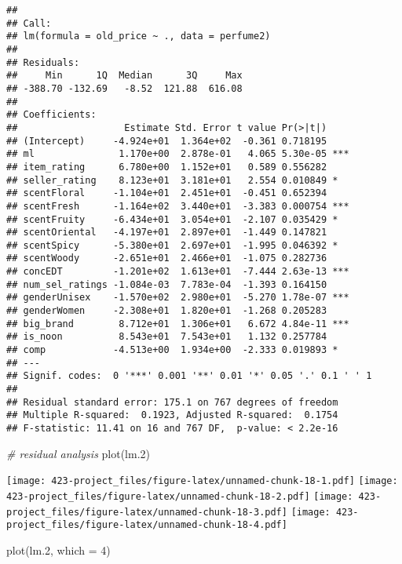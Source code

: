 \documentclass[
]{article}
\newenvironment{Shaded}{\begin{snugshade}}{\end{snugshade}}
\newcommand{\AttributeTok}[1]{\textcolor[rgb]{0.77,0.63,0.00}{#1}}
\newcommand{\CommentTok}[1]{\textcolor[rgb]{0.56,0.35,0.01}{\textit{#1}}}
\newcommand{\DecValTok}[1]{\textcolor[rgb]{0.00,0.00,0.81}{#1}}
\newcommand{\FloatTok}[1]{\textcolor[rgb]{0.00,0.00,0.81}{#1}}
\newcommand{\FunctionTok}[1]{\textcolor[rgb]{0.00,0.00,0.00}{#1}}
\newcommand{\NormalTok}[1]{#1}
\begin{document}
\begin{verbatim}
## 
## Call:
## lm(formula = old_price ~ ., data = perfume2)
## 
## Residuals:
##     Min      1Q  Median      3Q     Max 
## -388.70 -132.69   -8.52  121.88  616.08 
## 
## Coefficients:
##                   Estimate Std. Error t value Pr(>|t|)    
## (Intercept)     -4.924e+01  1.364e+02  -0.361 0.718195    
## ml               1.170e+00  2.878e-01   4.065 5.30e-05 ***
## item_rating      6.780e+00  1.152e+01   0.589 0.556282    
## seller_rating    8.123e+01  3.181e+01   2.554 0.010849 *  
## scentFloral     -1.104e+01  2.451e+01  -0.451 0.652394    
## scentFresh      -1.164e+02  3.440e+01  -3.383 0.000754 ***
## scentFruity     -6.434e+01  3.054e+01  -2.107 0.035429 *  
## scentOriental   -4.197e+01  2.897e+01  -1.449 0.147821    
## scentSpicy      -5.380e+01  2.697e+01  -1.995 0.046392 *  
## scentWoody      -2.651e+01  2.466e+01  -1.075 0.282736    
## concEDT         -1.201e+02  1.613e+01  -7.444 2.63e-13 ***
## num_sel_ratings -1.084e-03  7.783e-04  -1.393 0.164150    
## genderUnisex    -1.570e+02  2.980e+01  -5.270 1.78e-07 ***
## genderWomen     -2.308e+01  1.820e+01  -1.268 0.205283    
## big_brand        8.712e+01  1.306e+01   6.672 4.84e-11 ***
## is_noon          8.543e+01  7.543e+01   1.132 0.257784    
## comp            -4.513e+00  1.934e+00  -2.333 0.019893 *  
## ---
## Signif. codes:  0 '***' 0.001 '**' 0.01 '*' 0.05 '.' 0.1 ' ' 1
## 
## Residual standard error: 175.1 on 767 degrees of freedom
## Multiple R-squared:  0.1923, Adjusted R-squared:  0.1754 
## F-statistic: 11.41 on 16 and 767 DF,  p-value: < 2.2e-16
\end{verbatim}

\begin{Shaded}
\begin{Highlighting}[]
\CommentTok{\# residual analysis}
\FunctionTok{plot}\NormalTok{(lm}\FloatTok{.2}\NormalTok{)}
\end{Highlighting}
\end{Shaded}

\texttt{[image: 423-project\_files/figure-latex/unnamed-chunk-18-1.pdf]}
\texttt{[image: 423-project\_files/figure-latex/unnamed-chunk-18-2.pdf]}
\texttt{[image: 423-project\_files/figure-latex/unnamed-chunk-18-3.pdf]}
\texttt{[image: 423-project\_files/figure-latex/unnamed-chunk-18-4.pdf]}

\begin{Shaded}
\begin{Highlighting}[]
\FunctionTok{plot}\NormalTok{(lm}\FloatTok{.2}\NormalTok{, }\AttributeTok{which =} \DecValTok{4}\NormalTok{)}
\end{Highlighting}
\end{Shaded}
\end{document}
